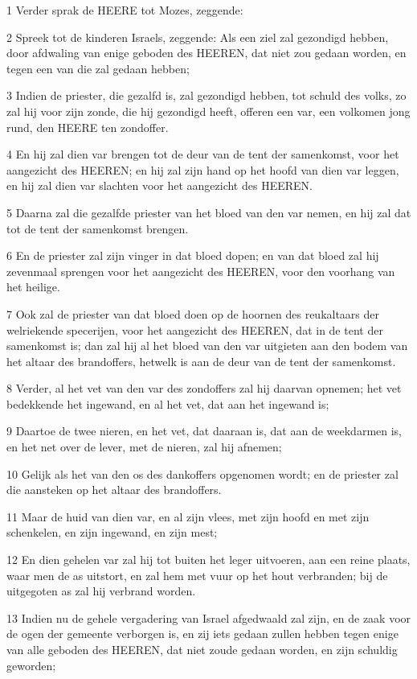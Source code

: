 \par 1 Verder sprak de HEERE tot Mozes, zeggende:
\par 2 Spreek tot de kinderen Israels, zeggende: Als een ziel zal gezondigd hebben, door afdwaling van enige geboden des HEEREN, dat niet zou gedaan worden, en tegen een van die zal gedaan hebben;
\par 3 Indien de priester, die gezalfd is, zal gezondigd hebben, tot schuld des volks, zo zal hij voor zijn zonde, die hij gezondigd heeft, offeren een var, een volkomen jong rund, den HEERE ten zondoffer.
\par 4 En hij zal dien var brengen tot de deur van de tent der samenkomst, voor het aangezicht des HEEREN; en hij zal zijn hand op het hoofd van dien var leggen, en hij zal dien var slachten voor het aangezicht des HEEREN.
\par 5 Daarna zal die gezalfde priester van het bloed van den var nemen, en hij zal dat tot de tent der samenkomst brengen.
\par 6 En de priester zal zijn vinger in dat bloed dopen; en van dat bloed zal hij zevenmaal sprengen voor het aangezicht des HEEREN, voor den voorhang van het heilige.
\par 7 Ook zal de priester van dat bloed doen op de hoornen des reukaltaars der welriekende specerijen, voor het aangezicht des HEEREN, dat in de tent der samenkomst is; dan zal hij al het bloed van den var uitgieten aan den bodem van het altaar des brandoffers, hetwelk is aan de deur van de tent der samenkomst.
\par 8 Verder, al het vet van den var des zondoffers zal hij daarvan opnemen; het vet bedekkende het ingewand, en al het vet, dat aan het ingewand is;
\par 9 Daartoe de twee nieren, en het vet, dat daaraan is, dat aan de weekdarmen is, en het net over de lever, met de nieren, zal hij afnemen;
\par 10 Gelijk als het van den os des dankoffers opgenomen wordt; en de priester zal die aansteken op het altaar des brandoffers.
\par 11 Maar de huid van dien var, en al zijn vlees, met zijn hoofd en met zijn schenkelen, en zijn ingewand, en zijn mest;
\par 12 En dien gehelen var zal hij tot buiten het leger uitvoeren, aan een reine plaats, waar men de as uitstort, en zal hem met vuur op het hout verbranden; bij de uitgegoten as zal hij verbrand worden.
\par 13 Indien nu de gehele vergadering van Israel afgedwaald zal zijn, en de zaak voor de ogen der gemeente verborgen is, en zij iets gedaan zullen hebben tegen enige van alle geboden des HEEREN, dat niet zoude gedaan worden, en zijn schuldig geworden;
